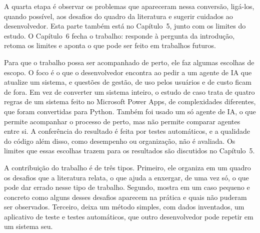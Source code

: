 A quarta etapa é observar os problemas que apareceram nessa conversão, ligá-los, quando possível, aos desafios do quadro da literatura e sugerir cuidados ao desenvolvedor. Esta parte também está no Capítulo~5, junto com os limites do estudo. O Capítulo~6 fecha o trabalho: responde à pergunta da introdução, retoma os limites e aponta o que pode ser feito em trabalhos futuros.

Para que o trabalho possa ser acompanhado de perto, ele faz algumas escolhas de escopo. O foco é o que o desenvolvedor encontra ao pedir a um agente de IA que atualize um sistema, e questões de gestão, de uso pelos usuários e de custo ficam de fora. Em vez de converter um sistema inteiro, o estudo de caso trata de quatro regras de um sistema feito no Microsoft Power Apps, de complexidades diferentes, que foram convertidas para Python. Também foi usado um só agente de IA, o que permite acompanhar o processo de perto, mas não permite comparar agentes entre si. A conferência do resultado é feita por testes automáticos, e a qualidade do código além disso, como desempenho ou organização, não é avaliada. Os limites que essas escolhas trazem para os resultados são discutidos no Capítulo~5.

A contribuição do trabalho é de três tipos. Primeiro, ele organiza em um quadro os desafios que a literatura relata, o que ajuda a enxergar, de uma vez só, o que pode dar errado nesse tipo de trabalho. Segundo, mostra em um caso pequeno e concreto como alguns desses desafios aparecem na prática e quais não puderam ser observados. Terceiro, deixa um método simples, com dados inventados, um aplicativo de teste e testes automáticos, que outro desenvolvedor pode repetir em um sistema seu.
